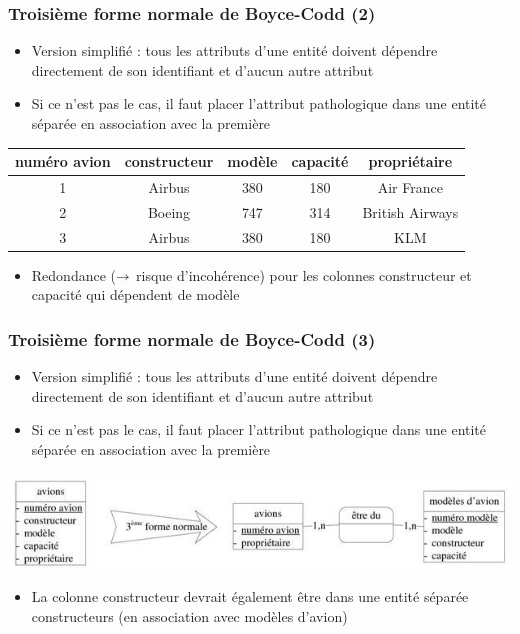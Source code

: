 \begin{frame}
  \frametitle{Troisième forme normale de Boyce-Codd (2)}
  \begin{itemize}
    \item Version simplifié : tous les attributs d'une entité doivent dépendre directement de son identifiant
      et d'aucun autre attribut
    \item Si ce n'est pas le cas, il faut placer l'attribut pathologique dans une entité séparée en
      association avec la première
  \end{itemize}
  \begin{tabular}{c | c | c | c | c }
    numéro avion & constructeur & modèle & capacité & propriétaire \\
    \hline \hline
    1 & Airbus & 380 & 180 & Air France \\
    2 & Boeing & 747 & 314 & British Airways \\
    3 & Airbus & 380 & 180 & KLM
  \end{tabular}
  \begin{itemize}
    \item Redondance ($\rightarrow$ risque d'incohérence) pour les colonnes constructeur
        et capacité qui dépendent de modèle
  \end{itemize}
\end{frame}

\begin{frame}
  \frametitle{Troisième forme normale de Boyce-Codd (3)}
  \begin{itemize}
    \item Version simplifié : tous les attributs d'une entité doivent dépendre directement de son identifiant et d'aucun autre
      attribut
    \item Si ce n'est pas le cas, il faut placer l'attribut pathologique dans une entité séparée en
      association avec la première
  \end{itemize}
  \begin{center}
    \includegraphics[width=0.9\linewidth]{troisieme_forme_normale.jpg}
  \end{center}
  \begin{itemize}
    \item La colonne constructeur devrait également être dans une entité séparée constructeurs (en association avec modèles d'avion)
  \end{itemize}
\end{frame}

